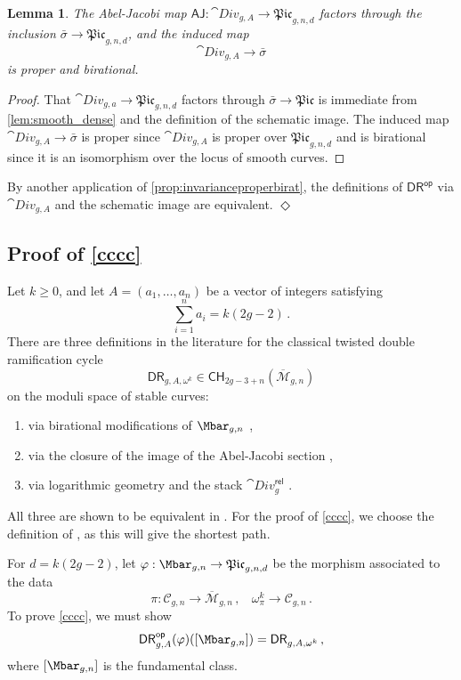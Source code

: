 \documentclass[a4paper,12pt]{article} %
\def\cM{{\mathcal{M}}}
\def\qed{{\hfill $\Diamond$}}
\theoremstyle{definition}
\theoremstyle{plain}%
\newtheorem{lemma}[definition]{Lemma}
\renewcommand{\phi}{\varphi}
\newcommand{\aj}{{\scriptstyle \mathsf{AJ}}}
\newcommand{\Picabs}{\mathfrak{Pic}}
\newcommand{\Chow}{\mathsf{CH}}
\newcommand{\DRop}{\mathsf{DR}^{\mathsf{op}}}
\begin{document}
\begin{lemma} \label{Lem:UschemdenseDiv}
The Abel-Jacobi map $\aj:\cat{Div}_{g,A} \to \Picabs_{g,n,d}$ factors through the
inclusion $\bar\sigma \to \Picabs_{g,n,d}$, and the induced map 
$$\cat{Div}_{g,A} \to \bar \sigma$$ 
is proper and birational. 
\end{lemma}
\begin{proof}
That $\cat{Div}_{g,a} \to \Picabs_{g,n,d}$ factors through $\bar\sigma \to \Picabs$ is immediate from \cref{lem:smooth_dense} and the definition of the schematic image. The induced map $\cat{Div}_{g,A} \to \bar \sigma$ is proper since $\cat{Div}_{g,A}$ is proper over $\Picabs_{g,n,d}$ and is birational since it is an isomorphism over the locus of smooth curves. 
\end{proof}

By another application of \cref{prop:invarianceproperbirat}, the definitions of $\DRop$ via 
$\cat{Div}_{g,A}$ and the
schematic image are equivalent. \qed

\subsection{Proof of \cref{cccc}}\label{proof1111}

Let $k\geq 0$, and let
 $A=(a_1,\ldots,a_n)$ be a vector of integers satisfying
$$\sum_{i=1}^n a_i=k(2g-2)\, .$$
There are three definitions in the literature for the classical twisted double ramification cycle
$$\mathsf{DR}_{g,A, \omega^k}\in \mathsf{CH}_{2g-3+n}(\overline{\cM}_{g,n}) $$
on the moduli space of stable curves:
\begin{enumerate}
\item[$\bullet$]via birational modifications of $\Mbar_{g,n}$ \cite{Holmes2017Extending-the-d}, 
\item[$\bullet$] via the closure of the image of the Abel-Jacobi section \cite{Holmes2017Jacobian-extens},
\item[$\bullet$]
via logarithmic geometry and the stack $\cat{Div}_g^{\mathsf{rel}}$ \cite{Marcus2017Logarithmic-com}. 
\end{enumerate}
All three are shown to be equivalent
in \cite{Holmes2017Extending-the-d,Holmes2017Jacobian-extens}.
For the proof of \cref{cccc}, we choose the definition of \cite{Marcus2017Logarithmic-com}, as this will give the shortest path. 

For $d=k(2g-2)$, let $\phi: \Mbar_{g,n} \to \Picabs_{g,n,d}$ be the morphism
associated to the data
\begin{equation}\label{fftt66673}
\pi: \mathcal{C}_{g,n} \rightarrow \overline{\cM}_{g,n}\, , \ \ \ \ \omega_\pi^k \rightarrow \mathcal{C}_{g,n}\, .
\end{equation}
To prove \cref{cccc}, we must show
$$\DRop_{g,A}(\phi)([\Mbar_{g,n}]) = \mathsf{DR}_{g,A, \omega^k}\, ,$$
where $[\Mbar_{g,n}]$ is the fundamental class. 
\end{document}
